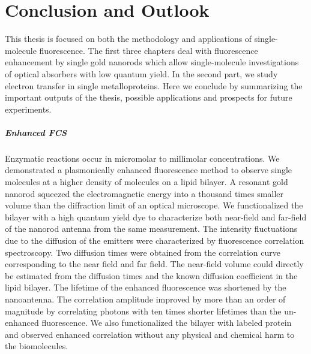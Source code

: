 \chapter*{Conclusion and Outlook}
\label{ch:conclusion}

This thesis is focused on both the methodology and applications of single-molecule fluorescence. The first three chapters deal with fluorescence enhancement by single gold nanorods which allow single-molecule investigations of optical absorbers with low quantum yield. In the second part, we study electron transfer in single metalloproteins. Here we conclude by summarizing the important outputs of the thesis, possible applications and prospects for future experiments.

\paragraph*{Enhanced FCS}
Enzymatic reactions occur in micromolar to millimolar concentrations. We demonstrated a plasmonically enhanced fluorescence method to observe single molecules at a higher density of molecules on a lipid bilayer. A resonant gold nanorod squeezed the electromagnetic energy into a thousand times smaller volume than the diffraction limit of an optical microscope. We functionalized the bilayer with a high quantum yield dye to characterize both near-field and far-field of the nanorod antenna from the same measurement. The intensity fluctuations due to the diffusion of the emitters were characterized by fluorescence correlation spectroscopy. Two diffusion times were obtained from the correlation curve corresponding to the near field and far field. The near-field volume could directly be estimated from the diffusion times and the known diffusion coefficient in the lipid bilayer. The lifetime of the enhanced fluorescence was shortened by the nanoantenna. The correlation amplitude improved by more than an order of magnitude by correlating photons with ten times shorter lifetimes than the un-enhanced fluorescence. We also functionalized the bilayer with labeled protein and observed enhanced correlation without any physical and chemical harm to the biomolecules.

